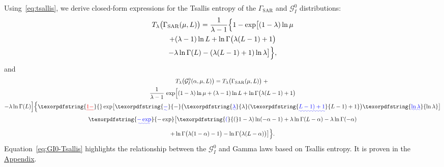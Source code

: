 \documentclass[
  lettersize  journal,
]{IEEEtran}%
\providecommand{\DIFaddtex}[1]{{\protect\color{blue}\uwave{#1}}} %
\providecommand{\DIFdeltex}[1]{{\protect\color{red}\sout{#1}}} %
\providecommand{\DIFaddbegin}{} %
\providecommand{\DIFaddend}{} %
\providecommand{\DIFdelbegin}{} %
\providecommand{\DIFdelend}{} %
\providecommand{\DIFadd}[1]{\texorpdfstring{\DIFaddtex{#1}}{#1}} %
\providecommand{\DIFdel}[1]{\texorpdfstring{\DIFdeltex{#1}}{}} %
\providecommand{\DIFscaledelfig}{0.5}
\newlength{\DIFdelgraphicswidth} %
\newlength{\DIFdelgraphicsheight} %
\providecommand{\DIFaddincludegraphics}[2][]{{\color{blue}\fbox{\DIFOincludegraphics[#1]{#2}}}} %
\providecommand{\DIFdelincludegraphics}[2][]{%
\sbox{\DIFdelgraphicsbox}{\DIFOincludegraphics[#1]{#2}}%
\settoboxwidth{\DIFdelgraphicswidth}{\DIFdelgraphicsbox} %
\settoboxtotalheight{\DIFdelgraphicsheight}{\DIFdelgraphicsbox} %
\scalebox{\DIFscaledelfig}{%
\parbox[b]{\DIFdelgraphicswidth}{\usebox{\DIFdelgraphicsbox}\\[-\baselineskip] \rule{\DIFdelgraphicswidth}{0em}}\llap{\resizebox{\DIFdelgraphicswidth}{\DIFdelgraphicsheight}{%
\setlength{\unitlength}{\DIFdelgraphicswidth}%
\begin{picture}(1,1)%
\thicklines\linethickness{2pt} %
{\color[rgb]{1,0,0}\put(0,0){\framebox(1,1){}}}%
{\color[rgb]{1,0,0}\put(0,0){\line( 1,1){1}}}%
{\color[rgb]{1,0,0}\put(0,1){\line(1,-1){1}}}%
\end{picture}%
}\hspace*{3pt}}} %
} %
\DeclareRobustCommand{\DIFaddbegin}{\DIFOaddbegin \let\includegraphics\DIFaddincludegraphics} %
\DeclareRobustCommand{\DIFaddend}{\DIFOaddend \let\includegraphics\DIFOincludegraphics} %
\DeclareRobustCommand{\DIFdelbegin}{\DIFOdelbegin \let\includegraphics\DIFdelincludegraphics} %
\DeclareRobustCommand{\DIFdelend}{\DIFOaddend \let\includegraphics\DIFOincludegraphics} %
\begin{document}
Using~\eqref{eq:tsallis}, we derive closed-form expressions for the
Tsallis entropy of the \(\Gamma_{\mathrm{SAR}}\) and \(\mathcal{G}^0_I\)
distributions: \begin{multline}
\label{eq:gammasar-Tsallis}
T_\lambda\bigl(\Gamma_{\mathrm{SAR}}(\mu, L)\bigr)=
\frac{1}{\lambda-1}\Bigl\{1-
\exp\bigl[
(1-\lambda)\ln\mu\\
+(\lambda-1)\ln L
+\ln\Gamma\bigl(\lambda(L-1)+1\bigr) \\
-\lambda\ln\Gamma(L)
-(\lambda(L-1)+1)\ln\lambda
\bigr]\Bigr\}, 
\end{multline} and \begin{multline}
\label{eq:GI0-Tsallis}
  T_\lambda\bigl(\mathcal{G}^0_I(\alpha, \mu, L)\bigr) = T_\lambda\bigl(\Gamma_{\mathrm{SAR}}(\mu, L)\bigr)\;+\;\\
  \frac{1}{\lambda-1}\,
  \exp\Bigl[
  (1-\lambda)\ln\mu
  +(\lambda-1)\ln L
  \DIFdelbegin %
\DIFdelend +\ln\Gamma\bigl(\lambda(L-1)+1\bigr)\DIFaddbegin \\
  \DIFaddend -\lambda\ln\Gamma(L)
  \Bigr]
  \DIFdelbegin %
\DIFdelend {}\Bigl\{\DIFdelbegin \DIFdel{1-
  }\DIFdelend \exp\bigl[\DIFaddbegin \DIFadd{-}\bigl(\DIFadd{\lambda}\DIFaddend (\DIFaddbegin \DIFadd{L-1)+1}\bigr)\DIFadd{\ln\lambda}\bigr]\\
  \DIFadd{-\exp}\bigl[
  \DIFadd{(}\DIFaddend 1-\lambda)\ln(-\alpha-1)
  +\lambda\ln\Gamma(L-\alpha)
  \DIFdelbegin %
\DIFdelend -\lambda\ln\Gamma(-\alpha) \DIFaddbegin \\
  \DIFaddend +\ln\Gamma\bigl(\lambda(1-\alpha)-1\bigr)
  \DIFdelbegin %
\DIFdelend -\ln\Gamma\bigl(\lambda(L-\alpha)\bigr)
  \bigr]\Bigr\}.
\end{multline} Equation~\eqref{eq:GI0-Tsallis} highlights the
relationship between the \(\mathcal{G}^0_I\) and Gamma laws based on
Tsallis entropy. It is proven in the \href{}{Appendix}.
\end{document}
